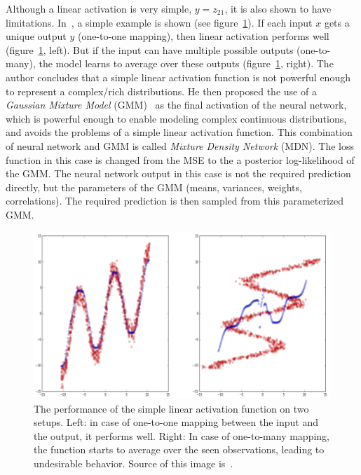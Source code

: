       \par Although a linear activation is very simple, $y=z_{21}$, it is also shown to have limitations. In~\citep{bishop1994mixture}, a simple example is shown (see figure~\ref{fig:linear_activation_issue}). If each input $x$ gets a unique output $y$ (one-to-one mapping), then linear activation performs well (figure~\ref{fig:linear_activation_issue}, left). But if the input can have multiple possible outputs (one-to-many), the model learns to average over these outputs (figure~\ref{fig:linear_activation_issue}, right). The author concludes that a simple linear activation function is not powerful enough to represent a complex/rich distributions. He then proposed the use of a \textit{Gaussian Mixture Model} (GMM)~\citep{Murphy:2012:MLP:2380985} as the final activation of the neural network, which is powerful enough to enable modeling complex continuous distributions, and avoids the problems of a simple linear activation function. This combination of neural network and GMM is called \textit{Mixture Density Network} (MDN). The loss function in this case is changed from the MSE to the a posterior log-likelihood of the GMM. The neural network output in this case is not the required prediction directly, but the parameters of the GMM (means, variances, weights, correlations). The required prediction is then sampled from this parameterized GMM.

      \begin{figure}[!htbp]
          \centering
          \includegraphics[scale=0.3]{images/sota/linear_activation_problem.png}
          \caption{The performance of the simple linear activation function on two setups. Left: in case of one-to-one mapping between the input and the output, it performs well. Right: In case of one-to-many mapping, the function starts to average over the seen observations, leading to undesirable behavior. Source of this image is~\citep{ha2015mdntf}.}
          \label{fig:linear_activation_issue}
      \end{figure}

